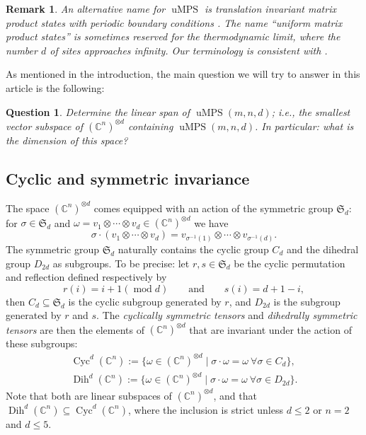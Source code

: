 \documentclass[10pt,a4paper]{amsart}
\numberwithin{equation}{section}
\newtheorem{Question}[Theorem]{Question}
\newtheorem{Remark}[Theorem]{Remark}
\newcommand{\CC}{\mathbb{C}}
\newcommand{\ot}{\otimes}
\newcommand{\SG}{\mathfrak{S}}
\DeclareMathOperator{\uMPS}{uMPS}
\DeclareMathOperator{\Cyc}{Cyc}
\DeclareMathOperator{\Dih}{Dih}
\begin{document}
\begin{Remark}
An alternative name for $\uMPS$ is \emph{translation invariant matrix product states with periodic boundary conditions} \cite{Critch2014AlgebraicGO, PerezGarciaVerstraeteMPS}. The name ``uniform matrix product states'' is sometimes reserved for the thermodynamic limit, where the number $d$ of sites approaches infinity. Our terminology is consistent with \cite{Czaplinski2019UniformMP, haegeman2014geometry}.
\end{Remark}

As mentioned in the introduction, the main question we will try to answer in this article is the following:
\begin{Question} \label{question:main}
Determine the linear span of $\uMPS(m,n,d)$; i.e., the smallest vector subspace of $(\CC^n)^{\ot d}$ containing $\uMPS(m,n,d)$. In particular: what is the dimension of this space?
\end{Question}

\subsection{Cyclic and symmetric invariance}
The space $(\CC^n)^{\ot d}$ comes equipped with an action of the symmetric group $\SG_d$: for $\sigma \in \SG_d$ and $\omega = v_1 \ot \cdots \ot v_d \in (\CC^n)^{\ot d}$ we have
\[
\sigma \cdot (v_1 \ot \cdots \ot v_d) = v_{\sigma^{-1}(1)} \ot \cdots \ot v_{\sigma^{-1}(d)}.
\]
The symmetric group $\SG_d$ naturally contains the cyclic group $C_d$ and the dihedral group $D_{2d}$ as subgroups. To be precise: let $r,s \in \SG_d$ be the cyclic permutation and reflection defined respectively by
\[
r(i) = i+1 (\operatorname{mod} d) \qquad \text{and} \qquad s(i) = d+1-i,
\]
then $C_d \subseteq \SG_d$ is the cyclic subgroup generated by $r$, and $D_{2d}$ is the subgroup generated by $r$ and $s$.
The \emph{cyclically symmetric tensors} and \emph{dihedrally symmetric tensors} are then the elements of $(\CC^n)^{\ot d}$ that are invariant under the action of these subgroups:
    \begin{gather*}
        \Cyc^d({\mathbb C}^n) := \big\{ \omega \in ({\mathbb C}^n)^{\ot d} \mid \sigma \cdot \omega = \omega \ \forall \sigma \in C_d\big\},\\
        \Dih^d({\mathbb C}^n) := \big\{ \omega \in ({\mathbb C}^n)^{\ot d} \mid \sigma \cdot \omega = \omega \  \forall \sigma \in D_{2d}\big\}.
    \end{gather*}
Note that both are linear subspaces of $(\CC^n)^{\ot d}$, and that $\Dih^d({\mathbb C}^n) \subseteq \Cyc^d({\mathbb C}^n)$, where the inclusion is strict unless $d \leq 2$ or $n=2$ and $d \leq 5$.
\end{document}
